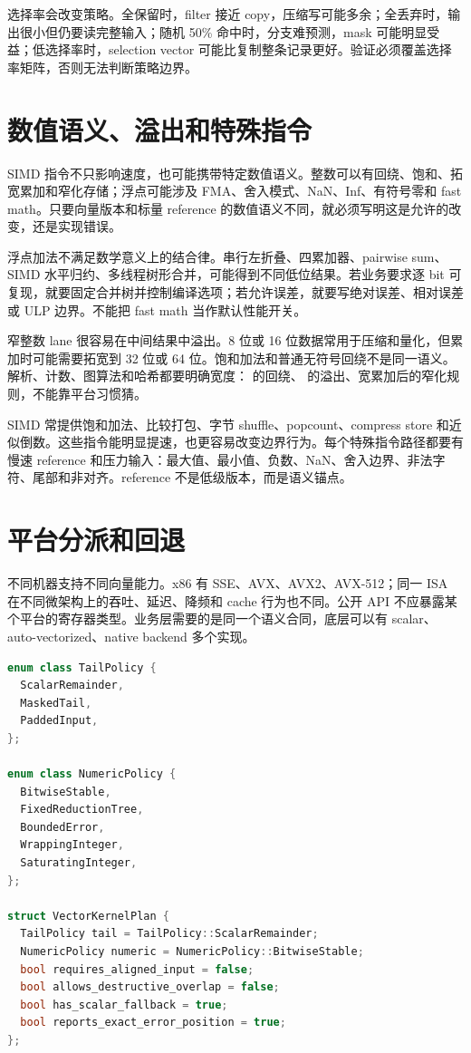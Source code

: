 选择率会改变策略。全保留时，filter 接近 copy，压缩写可能多余；全丢弃时，输出很小但仍要读完整输入；随机 50\% 命中时，分支难预测，mask 可能明显受益；低选择率时，selection vector 可能比复制整条记录更好。验证必须覆盖选择率矩阵，否则无法判断策略边界。

\section{数值语义、溢出和特殊指令}

SIMD 指令不只影响速度，也可能携带特定数值语义。整数可以有回绕、饱和、拓宽累加和窄化存储；浮点可能涉及 FMA、舍入模式、NaN、Inf、有符号零和 fast math。只要向量版本和标量 reference 的数值语义不同，就必须写明这是允许的改变，还是实现错误。

浮点加法不满足数学意义上的结合律。串行左折叠、四累加器、pairwise sum、SIMD 水平归约、多线程树形合并，可能得到不同低位结果。若业务要求逐 bit 可复现，就要固定合并树并控制编译选项；若允许误差，就要写绝对误差、相对误差或 ULP 边界。不能把 fast math 当作默认性能开关。

窄整数 lane 很容易在中间结果中溢出。8 位或 16 位数据常用于压缩和量化，但累加时可能需要拓宽到 32 位或 64 位。饱和加法和普通无符号回绕不是同一语义。解析、计数、图算法和哈希都要明确宽度： 的回绕、 的溢出、宽累加后的窄化规则，不能靠平台习惯猜。

SIMD 常提供饱和加法、比较打包、字节 shuffle、popcount、compress store 和近似倒数。这些指令能明显提速，也更容易改变边界行为。每个特殊指令路径都要有慢速 reference 和压力输入：最大值、最小值、负数、NaN、舍入边界、非法字符、尾部和非对齐。reference 不是低级版本，而是语义锚点。

\section{平台分派和回退}

不同机器支持不同向量能力。x86 有 SSE、AVX、AVX2、AVX-512；同一 ISA 在不同微架构上的吞吐、延迟、降频和 cache 行为也不同。公开 API 不应暴露某个平台的寄存器类型。业务层需要的是同一个语义合同，底层可以有 scalar、auto-vectorized、native backend 多个实现。

\begin{lstlisting}[language=C++,caption={VectorKernelPlan 的接口形态}]
enum class TailPolicy {
  ScalarRemainder,
  MaskedTail,
  PaddedInput,
};

enum class NumericPolicy {
  BitwiseStable,
  FixedReductionTree,
  BoundedError,
  WrappingInteger,
  SaturatingInteger,
};

struct VectorKernelPlan {
  TailPolicy tail = TailPolicy::ScalarRemainder;
  NumericPolicy numeric = NumericPolicy::BitwiseStable;
  bool requires_aligned_input = false;
  bool allows_destructive_overlap = false;
  bool has_scalar_fallback = true;
  bool reports_exact_error_position = true;
};
\end{lstlisting}

